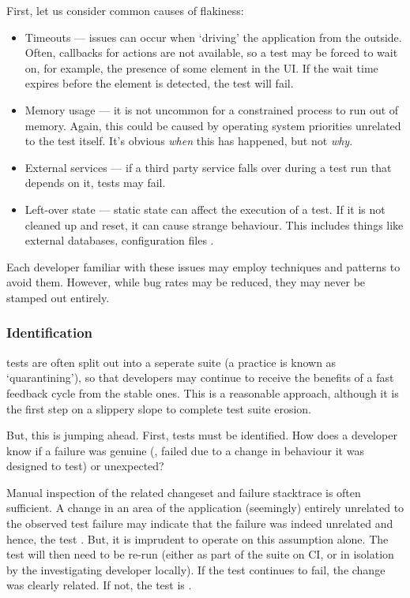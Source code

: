 First, let us consider common causes of flakiness:
\begin{itemize}
	\item Timeouts --- issues can occur when {\lq}driving{\rq} the application
	from the outside. Often, callbacks for actions are not available, so a test
	may be forced to wait on, for example, the presence of some element in the UI.
	If the wait time expires before the element is detected, the test will fail.
	\item Memory usage --- it is not uncommon for a constrained process to run out
	of memory. Again, this could be caused by operating system priorities
	unrelated to the test itself. It's obvious \textit{when} this has happened,
	but not \textit{why}.
	\item External services --- if a third party service falls over during a test
	run that depends on it, tests may fail.
	\item Left-over state --- static state can affect the execution of a test. If
	it is not cleaned up and reset, it can cause strange behaviour. This includes
	things like external databases, configuration files \etc.
\end{itemize}

Each developer familiar with these issues may employ techniques and patterns to
avoid them. However, while bug rates may be reduced, they may never be stamped
out entirely.

\subsubsection{Identification}

\Flaky tests are often split out into a seperate suite (a practice is known as
{\lq}quarantining{\rq}), so that developers may continue to receive the benefits
of a fast feedback cycle from the stable ones. This is a reasonable approach,
although it is the first step on a slippery slope to complete test suite
erosion.

But, this is jumping ahead. First, \flaky tests must be identified. How does a
developer know if a failure was genuine (\ie, failed due to a change in
behaviour it was designed to test) or unexpected?

Manual inspection of the related changeset and failure stacktrace is often
sufficient. A change in an area of the application (seemingly) entirely
unrelated to the observed test failure may indicate that the failure was indeed
unrelated and hence, the test \flaky. But, it is imprudent to operate on this
assumption alone. The test will then need to be re-run (either as part of the
suite on CI, or in isolation by the investigating developer locally). If the
test continues to fail, the change was clearly related. If not, the test is
\flaky.


